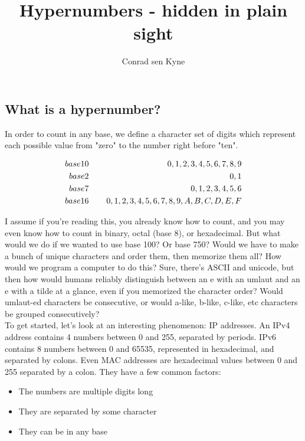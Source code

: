 \documentclass{article}
\title{\Large Hypernumbers -  hidden in plain sight}
\author{Conrad sen Kyne}
\date{}
\begin{document}
\maketitle

\subsection*{What is a hypernumber?}

In order to count in any base, we define a character set of digits which represent each possible value from "zero" to the number right before "ten".

\begin{align*}
base 10&\hspace{4mm}&  0, 1, 2, 3, 4, 5, 6, 7, 8, 9\\
base 2&\hspace{4mm}&  0, 1\\
base 7&\hspace{4mm}&  0, 1, 2, 3, 4, 5, 6\\
base 16&\hspace{4mm}&  0, 1, 2, 3, 4, 5, 6, 7, 8, 9, A, B, C, D, E, F\\
\end{align*}

\noindent I assume if you're reading this, you already know how to count, and you may even know how to count in binary, octal (base 8), or hexadecimal. But what would we do if we wanted to use base 100? Or base 750? Would we have to make a bunch of unique characters and order them, then memorize them all? How would we program a computer to do this? Sure, there's ASCII and unicode, but then how would humans reliably distinguish between an e with an umlaut and an e with a tilde at a glance, even if you memorized the character order? Would umlaut-ed characters be consecutive, or would a-like, b-like, c-like, etc characters be grouped consecutively?\\

\noindent To get started, let's look at an interesting phenomenon: IP addresses. An IPv4 address contains 4 numbers between 0 and 255, separated by periods. IPv6 contains 8 numbers between 0 and 65535, represented in hexadecimal, and separated by colons. Even MAC addresses are hexadecimal values between 0 and 255 separated by a colon. They have a few common factors:

\begin{itemize}
\item The numbers are multiple digits long
\item They are separated by some character
\item They can be in any base
\end{itemize}
\end{document}
